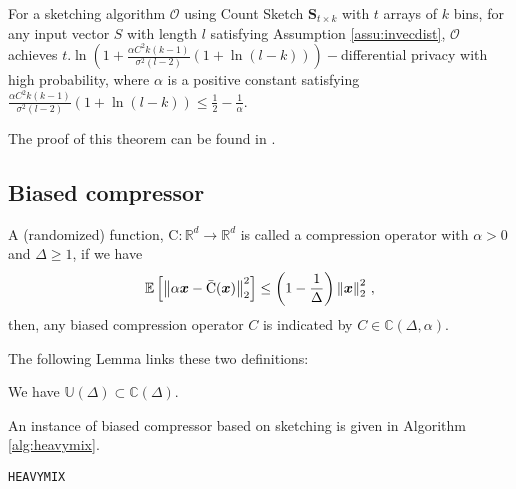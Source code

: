 \documentclass[review,onefignum,onetabnum]{siamart190516}
\begin{document}
\begin{theorem}
For a sketching algorithm $\mathcal{O}$ using Count Sketch $\mathbf{S}_{t\times k}$ with $t$ arrays of $k$ bins, for any input vector $S$ with length $l$ satisfying Assumption \ref{assu:invecdist}, $\mathcal{O}$ achieves $t.\ln \left(1+\frac{\alpha C^2 k(k-1)}{\sigma^2(l-2)}(1+\ln(l-k) )\right)-$differential privacy with high probability, where $\alpha$ is a positive constant satisfying $\frac{\alpha C^2 k(k-1)}{\sigma^2(l-2)}(1+\ln(l-k) )\leq \frac{1}{2}-\frac{1}{\alpha}$.
\end{theorem}
The proof of this theorem can be found in \cite{li2019privacy}.




\subsection{Biased compressor}
\begin{definition}
A (randomized) function,  ${\text{C}}:\mathbb{R}^{d}\rightarrow\mathbb{R}^{d}$ is called a compression operator with $\alpha>0$ and $\Delta\geq 1$, if we have 
\begin{align}\notag
    \mathbb{E}\left[\left\|\alpha\boldsymbol{x}-\bar{\text{C}}(\boldsymbol{x})\right\|^2_2\right]\leq \left(1-\frac{1}{\Delta}\right)\left\|\boldsymbol{x}\right\|^2_2\, ,
\end{align}
then, any biased compression operator $C$ is indicated by $C\in \mathbb{C}(\Delta,\alpha)$. 
\end{definition}
The following Lemma links these two definitions:
\begin{lemma}
We have $\mathbb{U}(\Delta)\subset\mathbb{C}(\Delta)$.
\end{lemma}

An instance of biased compressor based on sketching is given in Algorithm \ref{alg:heavymix}.
\begin{algorithm}[H]
\caption{\texttt{HEAVYMIX} \cite{ivkin2019communication} }\label{alg:heavymix}
\begin{algorithmic}[1]
\end{algorithmic}
\end{algorithm}
\end{document}
